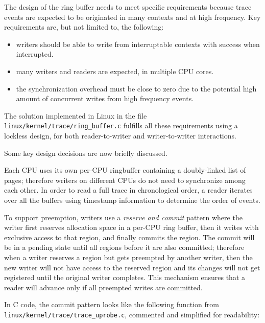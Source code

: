 The design of the ring buffer needs to meet specific requirements because trace
events are expected to be originated in many contexts and at high frequency. Key
requirements are, but not limited to, the following:

\begin{itemize}

  \item writers should be able to write from interruptable contexts with success
    when interrupted.

  \item many writers and readers are expected, in multiple CPU cores.

  \item the synchronization overhead must be close to zero due to
the potential high amount of concurrent writes from high frequency events.

\end{itemize}

The solution implemented in Linux in the file
\verb|linux/kernel/trace/ring_buffer.c| fulfills all these requirements using a
lockless design, for both reader-to-writer and writer-to-writer interactions.

Some key design decisions are now briefly discussed.

Each CPU uses its own per-CPU ringbuffer containing a doubly-linked list of
pages; therefore writers on different CPUs do not need to synchronize among each
other. In order to read a full trace in chronological order, a reader iterates
over all the buffers using timestamp information to determine the order of
events.

To support preemption, writers use a \textit{reserve and commit} pattern where
the writer first reserves allocation space in a per-CPU ring buffer, then it
writes with exclusive access to that region, and finally commits the region. The
commit will be in a pending state until all regions before it are also
committed; therefore when a writer reserves a region but gets preempted by
another writer, then the new writer will not have access to the reserved region
and its changes will not get registered until the original writer completes.
This mechanism ensures that a reader will advance only if all preempted writes
are committed.

In C code, the commit pattern looks like the following function from
\verb|linux/kernel/trace/trace_uprobe.c|, commented and simplified for
readability:

